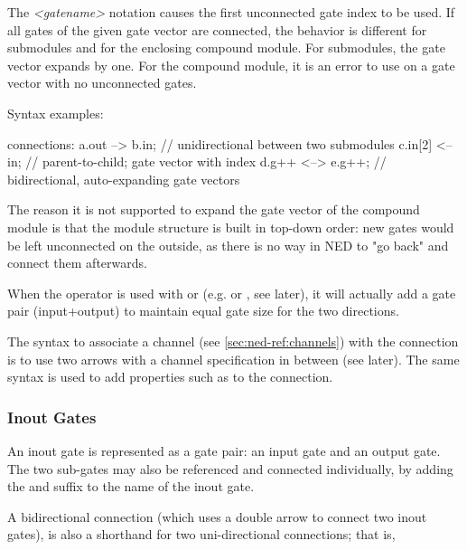 The \textit{<gatename>}\ttt{++} notation causes the first unconnected gate index
to be used. If all gates of the given gate vector are connected, the behavior
is different for submodules and for the enclosing compound module.
For submodules, the gate vector expands by one. For the compound module,
it is an error to use \ttt{++} on a gate vector with no unconnected gates.

Syntax examples:

\begin{ned}
connections:
   a.out --> b.in;   // unidirectional between two submodules
   c.in[2] <-- in;   // parent-to-child; gate vector with index
   d.g++ <--> e.g++; // bidirectional, auto-expanding gate vectors
\end{ned}

\begin{rationale}
    The reason it is not supported to expand the gate vector of the compound
    module is that the module structure is built in top-down order: new gates
    would be left unconnected on the outside, as there is no way in NED to
    "go back" and connect them afterwards.
\end{rationale}

When the \ttt{++} operator is used with  or 
(e.g.  or , see later), it will actually add
a gate pair (input+output) to maintain equal gate size for the two
directions.

The syntax to associate a channel (see \ref{sec:ned-ref:channels})
with the connection is to use two arrows with a channel specification
in between (see later). The same syntax is used to add properties such as
 to the connection.




\subsubsection{Inout Gates}
\label{sec:ned-ref:inout-gates}

An inout gate is represented as a gate pair: an input gate and an output gate.
The two sub-gates may also be referenced and connected individually, by adding
the  and  suffix to the name of the inout gate.

A bidirectional connection (which uses a double arrow to connect two inout gates),
is also a shorthand for two uni-directional connections; that is,

